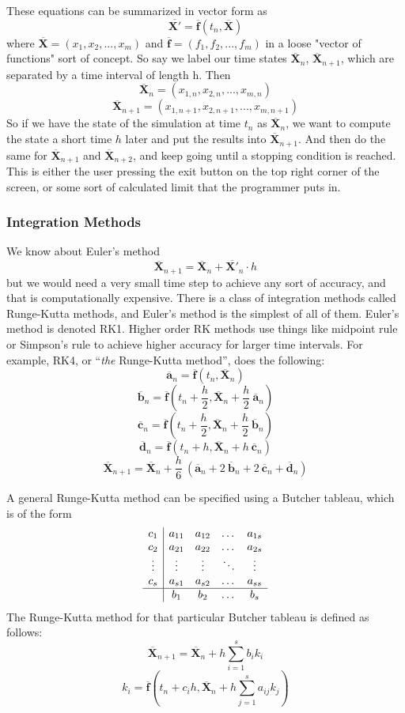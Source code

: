 \documentclass[12pt]{article}
\newcommand{\bfvec}[1]{\overline{\mathbf{#1}}}
\begin{document}
	These equations can be summarized in vector form as
			$$\bfvec{X'} = \bfvec{f}(t_n, \bfvec{X})$$
	where $\bfvec{X} = (x_1,x_2,...,x_m)$ and $\bfvec{f}=(f_1,f_2,...,f_m)$ in a loose "vector of functions" sort of concept. So say we label our time states $\bfvec{X}_n$, $\bfvec{X}_{n+1}$, which are separated by a time interval of length h. Then
			$$\bfvec{X}_n = (x_{1,n}, x_{2,n}, ..., x_{m,n})$$
			$$\bfvec{X}_{n+1} = (x_{1,n+1}, x_{2,n+1}, ..., x_{m,n+1})$$
	So if we have the state of the simulation at time $t_n$ as $\bfvec{X}_n$, we want to compute the state a short time $h$ later and put the results into $\bfvec{X}_{n+1}$. And then do the same for $\bfvec{X}_{n+1}$ and $\bfvec{X}_{n+2}$, and keep going until a stopping condition is reached. This is either the user pressing the exit button on the top right corner of the screen, or some sort of calculated limit that the programmer puts in.

	\subsubsection*{Integration Methods}
	
	We know about Euler's method 
			$$\bfvec{X}_{n+1} = \bfvec{X}_n + \bfvec{X'}_n \cdot h$$
	but we would need a very small time step to achieve any sort of accuracy, and that is computationally expensive. There is a class of integration methods called Runge-Kutta methods, and Euler's method is the simplest of all of them. Euler's method is denoted RK1. Higher order RK methods use things like midpoint rule or Simpson's rule to achieve higher accuracy for larger time intervals. For example, RK4, or ``\textit{the} Runge-Kutta method'', does the following:
			$$\bfvec{a}_n = \bfvec{f}(t_n, \bfvec{X}_n)$$
			$$\bfvec{b}_n = \bfvec{f}(t_n + \frac{h}{2},\bfvec{X}_n + \frac{h}{2}\ \bfvec{a}_n)$$
			$$\bfvec{c}_n = \bfvec{f}(t_n + \frac{h}{2},\bfvec{X}_n + \frac{h}{2}\ \bfvec{b}_n)$$
			$$\bfvec{d}_n = \bfvec{f}(t_n + h, \bfvec{X}_n + h\ \bfvec{c}_n)$$
			$$\bfvec{X}_{n+1} = \bfvec{X}_n + \frac{h}{6}\ (\bfvec{a}_n + 2\ \bfvec{b}_n + 2\ \bfvec{c}_n + \bfvec{d}_n)$$
			
	A general Runge-Kutta method can be specified using a Butcher tableau, which is of the form	
			\[\begin{array}{c|cccc}
				c_1    & a_{11} & a_{12}& \dots & a_{1s}\\
				c_2    & a_{21} & a_{22}& \dots & a_{2s}\\
				\vdots & \vdots & \vdots& \ddots& \vdots\\
				c_s    & a_{s1} & a_{s2}& \dots & a_{ss} \\
				\hline
       			& b_1    & b_2   & \dots & b_s\\
			\end{array}\]
	The Runge-Kutta method for that particular Butcher tableau is defined as follows:
			$$\bfvec{X}_{n+1} = \bfvec{X}_n + h \sum_{i=1}^s b_i k_i$$
			$$k_i = \bfvec{f}\left(t_n + c_i h, \bfvec{X}_n + h \sum_{j = 1}^{s} a_{ij} k_j\right)$$
\end{document}
